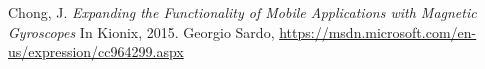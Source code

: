 \begin{thebibliography}{9}

  Chong, J. 
  \textit{Expanding the Functionality of Mobile Applications with Magnetic Gyroscopes} 
  In Kionix,
  2015.
  Georgio Sardo,
  \url{https://msdn.microsoft.com/en-us/expression/cc964299.aspx}
\end{thebibliography}